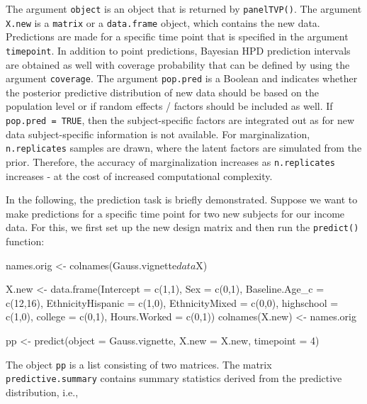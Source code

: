 \documentclass[a4paper, preprint, 3p,
authoryear]{elsarticle} %
\newenvironment{Shaded}{\begin{snugshade}}{\end{snugshade}}
\newcommand{\NormalTok}[1]{#1}
\begin{document}
The argument \texttt{object} is an object that is returned by
\texttt{panelTVP()}. The argument \texttt{X.new} is a \texttt{matrix} or
a \texttt{data.frame} object, which contains the new data. Predictions
are made for a specific time point that is specified in the argument
\texttt{timepoint}. In addition to point predictions, Bayesian HPD
prediction intervals are obtained as well with coverage probability that
can be defined by using the argument \texttt{coverage}. The argument
\texttt{pop.pred} is a Boolean and indicates whether the posterior
predictive distribution of new data should be based on the population
level or if random effects / factors should be included as well. If
\texttt{pop.pred = TRUE}, then the subject-specific factors are
integrated out as for new data subject-specific information is not
available. For marginalization, \texttt{n.replicates} samples are drawn,
where the latent factors are simulated from the prior. Therefore, the
accuracy of marginalization increases as \texttt{n.replicates} increases
- at the cost of increased computational complexity.

In the following, the prediction task is briefly demonstrated. Suppose
we want to make predictions for a specific time point for two new
subjects for our income data. For this, we first set up the new design
matrix and then run the \texttt{predict()} function:

\begin{Shaded}
\begin{Highlighting}[]
\NormalTok{names.orig \textless{}{-} colnames(Gauss.vignette$data$X)}

\NormalTok{X.new \textless{}{-} data.frame(Intercept = c(1,1),}
\NormalTok{                    Sex = c(0,1),}
\NormalTok{                    Baseline.Age\_c = c(12,16),}
\NormalTok{                    EthnicityHispanic = c(1,0),}
\NormalTok{                    EthnicityMixed = c(0,0),}
\NormalTok{                    highschool = c(1,0),}
\NormalTok{                    college = c(0,1),}
\NormalTok{                    Hours.Worked = c(0,1))}
\NormalTok{colnames(X.new) \textless{}{-} names.orig}

\NormalTok{pp \textless{}{-} predict(object = Gauss.vignette,}
\NormalTok{              X.new = X.new,}
\NormalTok{              timepoint = 4)}
\end{Highlighting}
\end{Shaded}

The object \texttt{pp} is a list consisting of two matrices. The matrix
\texttt{predictive.summary} contains summary statistics derived from the
predictive distribution, i.e.,
\end{document}
